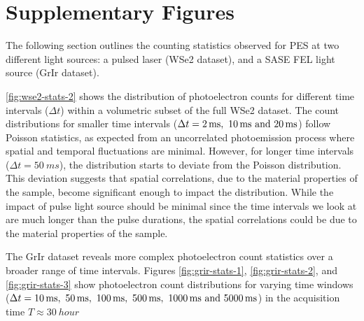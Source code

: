 

\FloatBarrier
\section{Supplementary Figures}
The following section outlines the counting statistics observed for \gls{PES} at two different light sources: a pulsed laser (\gls{WSe2} dataset), and a \gls{SASE} \gls{FEL} light source (\gls{GrIr} dataset). 

\cref{fig:wse2-stats-2} shows the distribution of photoelectron counts for different time intervals ($\Delta t$) within a volumetric subset of the full \gls{WSe2} dataset. The count distributions for smaller time intervals ($\Delta t = \qtylist{2;10;20}{ms}$) follow Poisson statistics, as expected from an uncorrelated photoemission process where spatial and temporal fluctuations are minimal. However, for longer time intervals ($\Delta t = \qty{50}{ms}$), the distribution starts to deviate from the Poisson distribution. This deviation suggests that spatial correlations, due to the material properties of the sample, become significant enough to impact the distribution. While the impact of pulse light source should be minimal since the time intervals we look at are much longer than the pulse durations, the spatial correlations could be due to the material properties of the sample.


The \gls{GrIr} dataset reveals more complex photoelectron count statistics over a broader range of time intervals. Figures \ref{fig:grir-stats-1}, \ref{fig:grir-stats-2}, and \ref{fig:grir-stats-3} show photoelectron count distributions for varying time windows ($\Delta t = \qtylist{10;50;100;500;1000;5000}{ms}$) in the acquisition time $T\approx\qty{30}{hour}$



